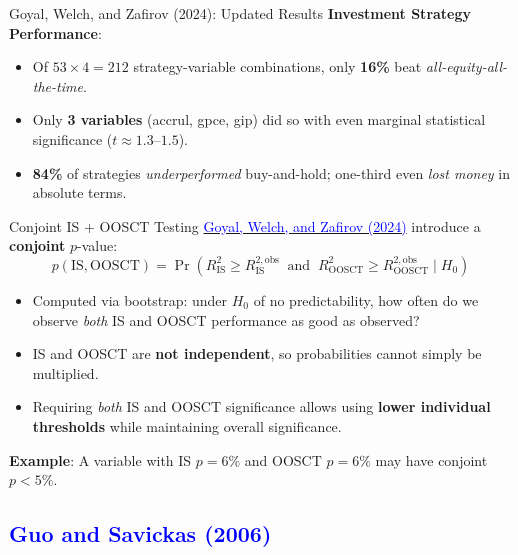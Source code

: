 \documentclass{beamer}
\begin{document}
\begin{frame}[allowframebreaks]{Goyal, Welch, and Zafirov (2024): Updated Results}
    \textbf{Investment Strategy Performance}:
    \begin{itemize}
        \item Of $53 \times 4 = 212$ strategy-variable combinations, only \textbf{16\%} beat \textit{all-equity-all-the-time}.
        \item Only \textbf{3 variables} (accrul, gpce, gip) did so with even marginal statistical significance ($t \approx 1.3$--$1.5$).
        \item \textbf{84\%} of strategies \textit{underperformed} buy-and-hold; one-third even \textit{lost money} in absolute terms.
    \end{itemize}
\end{frame}

\begin{frame}{Conjoint IS + OOSCT Testing}
    \href{https://doi.org/10.1093/rfs/hhae044}{\textcolor{blue}{Goyal, Welch, and Zafirov (2024)}} introduce a \textbf{conjoint} $p$-value:
    \begin{equation}
        p(\text{IS}, \text{OOSCT}) = \Pr\left(R^2_{\text{IS}} \geq R^{2,\text{obs}}_{\text{IS}} \;\;\text{and}\;\; R^2_{\text{OOSCT}} \geq R^{2,\text{obs}}_{\text{OOSCT}} \;\Big|\; H_0\right)
    \end{equation}
    \begin{itemize}
        \item Computed via bootstrap: under $H_0$ of no predictability, how often do we observe \textit{both} IS and OOSCT performance as good as observed?
        \item IS and OOSCT are \textbf{not independent}, so probabilities cannot simply be multiplied.
        \item Requiring \textit{both} IS and OOSCT significance allows using \textbf{lower individual thresholds} while maintaining overall significance.
    \end{itemize}

    \vspace{0.3cm}
    \textbf{Example}: A variable with IS $p = 6\%$ and OOSCT $p = 6\%$ may have conjoint $p < 5\%$.
\end{frame}

\subsection{\textcolor{blue}{Guo and Savickas (2006)}}
\end{document}
